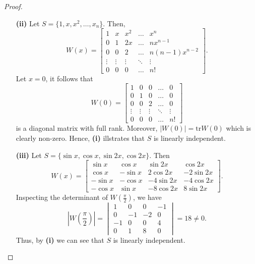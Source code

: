\documentclass[ 12pt ]{article}
\begin{document}
\begin{enumerate}
\begin{proof}
\begin{enumerate}
				\item[\textbf{(ii)}] Let $S = \{ 1, x, x^2, \hdots, x_n \}$. Then, $$W(x) = \begin{bmatrix} 1 & x & x^2 & \hdots & x^n \\ 0 & 1 & 2x & \hdots & nx^{n-1} \\
					0 & 0 & 2 & \hdots & n(n-1)x^{n-2} \\ \vdots & \vdots & \vdots & \ddots & \vdots \\ 0 & 0 & 0 & \hdots & n! \end{bmatrix}.$$ Let $x = 0$, it follows that
					$$W(0) = \begin{bmatrix} 1 & 0 & 0 & \hdots & 0 \\ 0 & 1 & 0 & \hdots & 0 \\ 0 & 0 & 2 & \hdots & 0 \\ \vdots & \vdots & \vdots & \ddots & \vdots \\ 0 & 0 & 0 &
					\hdots & n! \end{bmatrix}$$ is a diagonal matrix with full rank. Moreover, $|W(0)| = \mathrm{tr}W(0)$ which is clearly non-zero. Hence, \textbf{(i)} illstrates that
					$S$ is linearly independent.

				\item[\textbf{(iii)}] Let $S = \{ \sin x, \cos x, \sin 2x, \cos 2x \}$. Then $$W(x) = \begin{bmatrix} \sin x & \cos x & \sin 2x & \cos 2x \\ \cos x & -\sin x & 2\cos 2x
					& -2\sin 2x \\ -\sin x & -\cos x & -4\sin 2x & -4\cos 2x \\ -\cos x & \sin x & -8\cos 2x & 8\sin 2x \end{bmatrix}.$$ Inspecting the determinant of
					$W\left ( \frac{\pi}{2} \right )$, we have $$\left | W\left ( \frac{\pi}{2} \right ) \right | = \begin{vmatrix} 1 & 0 & 0 & -1 \\ 0 & -1 & -2 & 0 \\ -1 & 0 & 0 & 4 \\ 0 & 1 & 8 & 0
					\end{vmatrix} = 18 \neq 0.$$ Thus, by \textbf{(i)} we can see that $S$ is linearly independent.
			\end{enumerate}
		\end{proof}

\end{enumerate}
\end{document}
